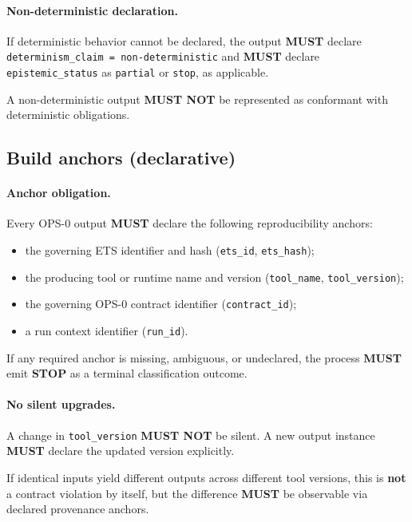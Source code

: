 \paragraph{Non-deterministic declaration.}
If deterministic behavior cannot be declared,
the output \textbf{MUST} declare
\texttt{determinism\_claim = non-deterministic}
and \textbf{MUST} declare
\texttt{epistemic\_status} as
\texttt{partial} or \texttt{stop}, as applicable.

A non-deterministic output
\textbf{MUST NOT} be represented
as conformant with deterministic obligations.

\subsection{Build anchors (declarative)}
\paragraph{Anchor obligation.}
Every OPS-0 output \textbf{MUST} declare
the following reproducibility anchors:

\begin{itemize}
  \item the governing ETS identifier and hash
        (\texttt{ets\_id}, \texttt{ets\_hash});
  \item the producing tool or runtime name and version
        (\texttt{tool\_name}, \texttt{tool\_version});
  \item the governing OPS-0 contract identifier
        (\texttt{contract\_id});
  \item a run context identifier
        (\texttt{run\_id}).
\end{itemize}

If any required anchor is missing,
ambiguous, or undeclared,
the process \textbf{MUST} emit \textbf{STOP}
as a terminal classification outcome.

\paragraph{No silent upgrades.}
A change in \texttt{tool\_version}
\textbf{MUST NOT} be silent.
A new output instance \textbf{MUST}
declare the updated version explicitly.

If identical inputs yield different outputs
across different tool versions,
this is \textbf{not} a contract violation by itself,
but the difference \textbf{MUST}
be observable via declared provenance anchors.

